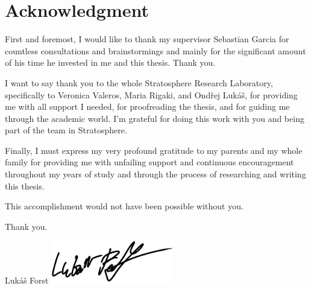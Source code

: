 \vspace*{\fill}

\section*{Acknowledgment}
First and foremost, I would like to thank my supervisor Sebastian Garcia for countless consultations and brainstormings and mainly for the significant amount of his time he invested in me and this thesis. Thank you.

I want to say thank you to the whole Stratosphere Research Laboratory, specifically to Veronica Valeros, Maria Rigaki, and Ondřej Lukáš, for providing me with all support I needed, for proofreading the thesis, and for guiding me through the academic world.
I'm grateful for doing this work with you and being part of the team in Stratosphere.

Finally, I must express my very profound gratitude to my parents and my whole family for providing me with unfailing support and continuous encouragement throughout my years of study and through the process of researching and writing this thesis. 

\bigskip \noindent
This accomplishment would not have been possible without you.
  
\bigskip \noindent
Thank you.
  
\bigskip \noindent
Lukáš Forst
\hspace*{0.6\textwidth} \includegraphics[width=0.4\textwidth]{assets/signature.png}

\thispagestyle{empty}

\cleardoublepage